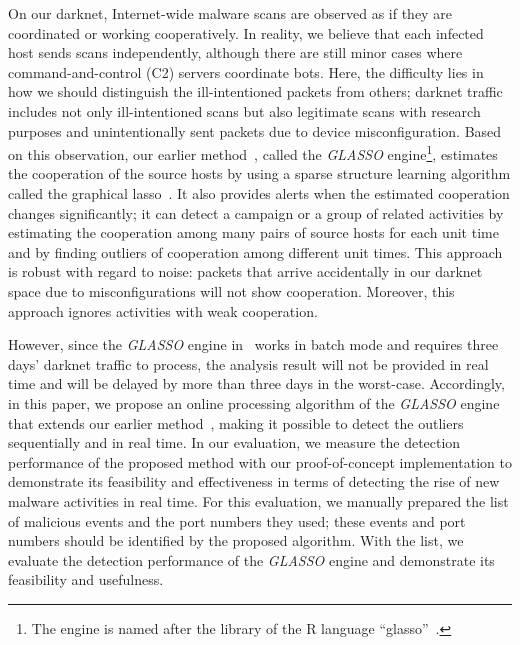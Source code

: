 \documentclass[conference]{IEEEtran}
\begin{document}
On our darknet, Internet-wide malware scans are observed as if they are coordinated or working cooperatively.
In reality, we believe that each infected host sends scans independently, although there are still minor cases where command-and-control (C2) servers coordinate bots.
Here, the difficulty lies in how we should distinguish the ill-intentioned packets from others; darknet traffic includes not only ill-intentioned scans but also legitimate scans with research purposes and unintentionally sent packets due to device misconfiguration.
Based on this observation, our earlier method~\cite{Han}, called the {\it GLASSO} engine\footnote{The engine is named after the library of the R language ``glasso''~\cite{Friedman_glasso}.}, estimates the cooperation of the source hosts by using a sparse structure learning algorithm called the graphical lasso~\cite{Friedman}.
It also provides alerts when the estimated cooperation changes significantly; it can detect a campaign or a group of related activities by estimating the cooperation among many pairs of source hosts for each unit time and by finding outliers of cooperation among different unit times.
This approach is robust with regard to noise: packets that arrive accidentally in our darknet space due to misconfigurations will not show cooperation.
Moreover, this approach ignores activities with weak cooperation.

However, since the {\it GLASSO} engine in~\cite{Han} works in batch mode and requires three days' darknet traffic to process, the analysis result will not be provided in real time and will be delayed by more than three days in the worst-case.
Accordingly, in this paper, we propose an online processing algorithm of the {\it GLASSO} engine that extends our earlier method~\cite{Han}, making it possible to detect the outliers sequentially and in real time.
In our evaluation, we measure the detection performance of the proposed method with our proof-of-concept implementation to demonstrate its feasibility and effectiveness in terms of detecting the rise of new malware activities in real time.
For this evaluation, we manually prepared the list of malicious events and the port numbers they used; these events and port numbers should be identified by the proposed algorithm.
With the list, we evaluate the detection performance of the {\it GLASSO} engine and demonstrate its feasibility and usefulness.
\end{document}
